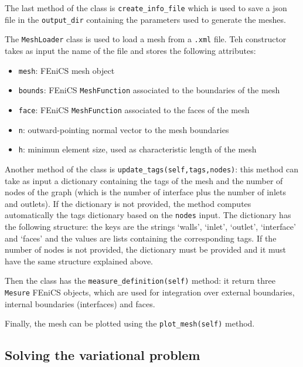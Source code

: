 \documentclass[11pt,a4paper]{article}
\begin{document}
The last method of the class is \texttt{create\_info\_file} which is used to save a json file in the \texttt{output\_dir} containing the parameters used to generate the meshes.

The \texttt{MeshLoader} class is used to load a mesh from a \texttt{.xml} file. Teh constructor takes as input the name of the file and stores the following attributes:
\begin{itemize}
    \item \texttt{mesh}: FEniCS mesh object
    \item \texttt{bounds}: FEniCS \texttt{MeshFunction} associated to the boundaries of the mesh
    \item \texttt{face}: FEniCS \texttt{MeshFunction} associated to the faces of the mesh
    \item \texttt{n}: outward-pointing normal vector to the mesh boundaries
    \item \texttt{h}: minimun element size, used as characteristic length of the mesh
\end{itemize}

Another method of the class is \texttt{update\_tags(self,tags,nodes)}: this method can take as input a dictionary containing the tags of the mesh and the number of nodes of the graph (which is the number of interface plus the number of inlets and outlets). If the dictionary is not provided, the method computes automatically the tags dictionary based on the \texttt{nodes} input. The dictionary has the following structure: the keys are the strings `walls', `inlet', `outlet', `interface' and `faces' and the values are lists containing the corresponding tags. %
If the number of nodes is not provided, the dictionary must be provided and it must have the same structure explained above.

Then the class has the \texttt{measure\_definition(self)} method: it return three \texttt{Mesure} FEniCS objects, which are used for integration over external boundaries, internal boundaries (interfaces) and faces. 

Finally, the mesh can be plotted using the \texttt{plot\_mesh(self)} method.

\subsection{Solving the variational problem}
\end{document}
